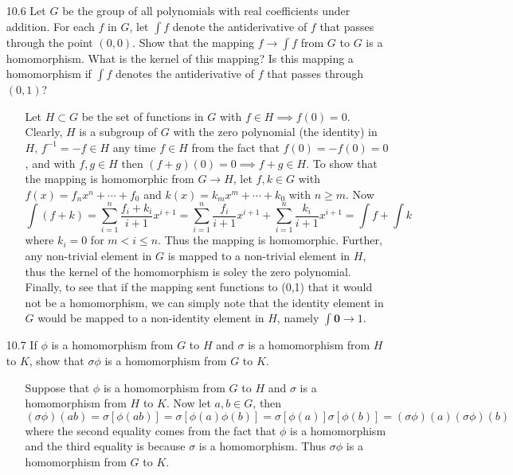 \documentclass[12pt]{article}
\begin{document}
\begin{enumerate}
\item[10.6] Let $G$ be the group of all polynomials with real coefficients under addition. For
each $f$ in $G$, let $\int f$ denote the antiderivative of $f$ that passes through the point $(0, 0)$. Show that the mapping $f \rightarrow \int f$ from $G$ to $G$ is a homomorphism. What is the kernel of this mapping? Is this mapping a homomorphism if $\int f$ denotes the antiderivative of $f$ that passes through $(0, 1)$?
\begin{enumerate}
\item[] Let $H \subset G$ be the set of functions in $G$ with $f \in H \implies f(0) = 0$. Clearly, 
$H$ is a subgroup of $G$ with the zero polynomial (the identity) in $H$,
$f^{-1} = -f \in H$ any time $f \in H$ from the fact that $f(0) = -f(0) = 0$, and with 
$f, g \in H$ then $(f+g)(0) = 0 \implies f+g \in H$.
To show that the mapping is homomorphic from $G \to H$, let $f, k \in G$ with $f(x) =
f_nx^n + \cdots + f_0$ and $k(x) = k_mx^m + \cdots + k_0$ with $n \geq m$. Now
\[
\int (f + k) = \sum^n_{i = 1} \frac{f_i + k_i}{i + 1}x^{i+1} = 
\sum^n_{i = 1} \frac{f_i}{i + 1}x^{i+1}  + \sum^n_{i = 1} \frac{k_i}{i + 1}x^{i+1}
= \int f + \int k
\]
where $k_i = 0$ for $m < i \leq n$. Thus the mapping is homomorphic. Further, any
non-trivial element in $G$ is mapped to a non-trivial element in $H$, thus the kernel 
of the homomorphism is soley the zero polynomial. Finally, to see that if the mapping
sent functions to (0,1) that it would not be a homomorphism, we can simply note that the 
identity element in $G$ would be mapped to a non-identity element in $H$, namely
$\int \mathbf{0} \to 1$. 
\end{enumerate}

\item[10.7] If $\phi$ is a homomorphism from $G$ to $H$ and $\sigma$ is a homomorphism from 
$H$ to $K$, show that $\sigma \phi$ is a homomorphism from $G$ to $K$.
\begin{enumerate}
\item[] Suppose that $\phi$ is a homomorphism from $G$ to $H$ and $\sigma$ is a homomorphism from
$H$ to $K$. Now let $a, b \in G$, then 
\[
(\sigma \phi )(ab) = \sigma [\phi (ab)] = \sigma [\phi (a) \phi (b)] =
\sigma [\phi (a)] \sigma [\phi (b)] = (\sigma \phi )(a) (\sigma \phi )(b)
\]
where the second equality comes from the fact that $\phi$ is a homomorphism and 
the third equality is because $\sigma$ is a homomorphism. Thus $\sigma \phi$ is a homomorphism
from $G$ to $K$.
\end{enumerate}


\end{enumerate}
\end{document}
